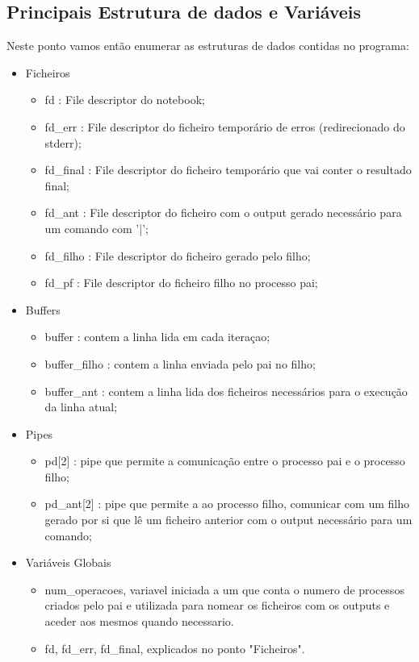 \documentclass{report}
\begin{document}
\subsection{Principais Estrutura de dados e Variáveis}
Neste ponto vamos então enumerar as estruturas de dados contidas no programa:
\begin{itemize}
    \item Ficheiros
    \begin{itemize}
        \item fd : File descriptor do notebook;
        \item fd\_err : File descriptor do ficheiro temporário de erros (redirecionado do stderr);
        \item fd\_final : File descriptor do ficheiro temporário que vai conter o resultado final;
        \item fd\_ant : File descriptor do ficheiro com o output gerado necessário para um comando com '|';
        \item fd\_filho : File descriptor do ficheiro gerado pelo filho;
        \item fd\_pf : File descriptor do ficheiro filho no processo pai; 
    \end{itemize}
    \item Buffers
    \begin{itemize}
        \item buffer : contem a linha lida em cada iteraçao;
        \item buffer\_filho : contem a linha enviada pelo pai no filho;
        \item buffer\_ant : contem a linha lida dos ficheiros necessários para o execução da linha atual; 
    \end{itemize}
    \item Pipes
        \begin{itemize}
            \item pd[2] : pipe que permite a comunicação entre o processo pai e o processo filho;
            \item pd\_ant[2] : pipe que permite a ao processo filho, comunicar com um filho gerado por si que lê um ficheiro anterior com o output necessário para um comando;
        \end{itemize}
    \item Variáveis Globais
        \begin{itemize}
            \item num\_operacoes, variavel iniciada a um que conta o numero de processos criados pelo pai e utilizada para nomear os ficheiros com os outputs e aceder aos mesmos quando necessario.
            \item fd, fd\_err, fd\_final, explicados no ponto "Ficheiros". 
        \end{itemize}
\end{itemize}
\end{document}
